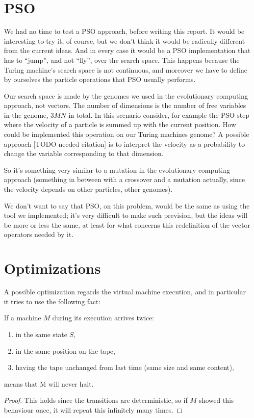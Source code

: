 \documentclass{report}
\begin{document}
\section{PSO}
We had no time to test a PSO approach, before writing this report. It would be interesting to try it, of course, but we don't think it would be radically different from the current ideas. And in every case it would be a PSO implementation that has to ``jump'', and not ``fly'', over the search space. This happens because the Turing machine's search space is not continuous, and moreover we have to define by ourselves the particle operations that PSO usually performs.

Our search space is made by the genomes we used in the evolutionary computing approach, not vectors. The number of dimensions is the number of free variables in the genome, $3MN$ in total.
In this scenario consider, for example the PSO step where the velocity of a particle is summed up with the current position. How could be implemented this operation on our Turing machines genome? A possible approach [TODO needed citation] is to interpret the velocity as a probability to change the variable corresponding to that dimension.

So it's something very similar to a mutation in the evolutionary computing approach (something in between with a crossover and a mutation actually, since the velocity depends on other particles, other genomes).

We don't want to say that PSO, on this problem, would be the same as using the tool we implemented; it's very difficult to make such prevision, but the ideas will be more or less the same, at least for what concerns this redefinition of the vector operators needed by it.

\section{Optimizations}
A possible optimization regards the virtual machine execution, and in particular it tries to use the following fact:

\begin{Thm}
If a machine $M$ during its execution arrives twice:
\begin{enumerate}
\item in the same state $S$,
\item in the same position on the tape,
\item having the tape unchanged from last time (same size and same content),
\end{enumerate}
means that M will never halt.
\end{Thm}
\begin{proof}
This holds since the transitions are deterministic, so if $M$ showed this behaviour once, it will repeat this infinitely many times.
\end{proof}
\end{document}
